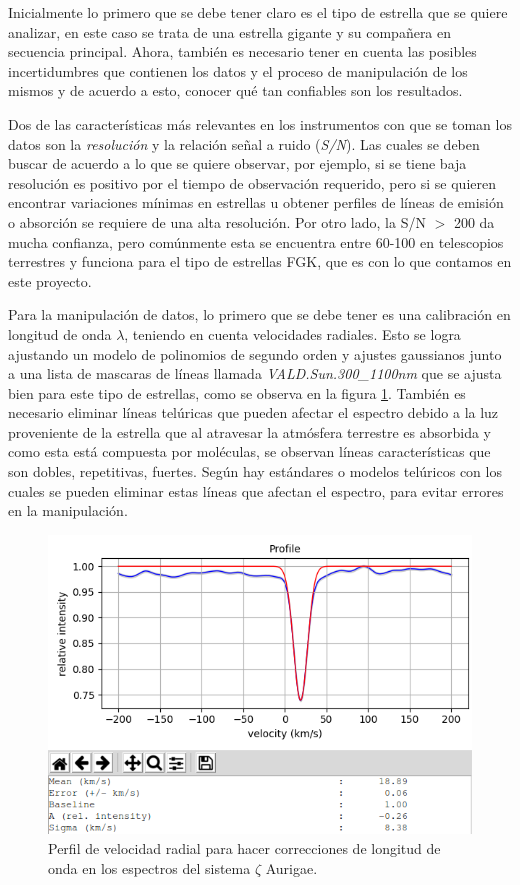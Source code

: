 \documentclass[12pt,oneside,openany,letter]{book}
\begin{document}
\noindent Inicialmente lo primero que se debe tener claro es el tipo de estrella que se quiere analizar, en este caso se trata de una estrella gigante y su compañera en secuencia principal. Ahora, también es necesario tener en cuenta las posibles incertidumbres que contienen los datos y el proceso de manipulación de los mismos y de acuerdo a esto, conocer qué tan confiables son los resultados.
\vspace{2mm}

\noindent Dos de las características más relevantes en los instrumentos con que se toman los datos son la \textit{resolución} y la relación señal a ruido (\textit{S/N}). Las cuales se deben buscar de acuerdo a lo que se quiere observar, por ejemplo, si se tiene baja resolución es positivo por el tiempo de observación requerido, pero si se quieren encontrar variaciones mínimas en estrellas u obtener perfiles de líneas de emisión o absorción se requiere de una alta resolución. Por otro lado, la S/N $>$ 200 da mucha confianza, pero comúnmente esta se encuentra entre 60-100 en telescopios terrestres y funciona para el tipo de estrellas FGK, que es con lo que contamos en este proyecto.
\vspace{2mm}


Para la manipulación de datos, lo primero que se debe tener es una calibración en longitud de onda $\lambda$, teniendo en cuenta velocidades radiales. Esto se logra ajustando un modelo de polinomios de segundo orden y ajustes gaussianos junto a una lista de mascaras de líneas llamada \textit{VALD.Sun.300\_1100nm} que se ajusta bien para este tipo de estrellas, como se observa en la figura \ref{fig:vel_radial}. También es necesario eliminar líneas telúricas que pueden afectar el espectro debido a la luz proveniente de la estrella que al atravesar la atmósfera terrestre es absorbida y como esta está compuesta por moléculas, se observan líneas características que son dobles, repetitivas, fuertes. Según \citep{bertaux2014tapas} hay estándares o modelos telúricos con los cuales se pueden eliminar estas líneas que afectan el espectro, para evitar errores en la manipulación. 

\begin{figure}[h]
    \centering
    \includegraphics[width=0.8\linewidth]{Images/correct_vel_rad.PNG}
    \caption{Perfil de velocidad radial para hacer correcciones de longitud de onda en los espectros del sistema $\zeta$ Aurigae.}
    \label{fig:vel_radial}
\end{figure}
\end{document}

